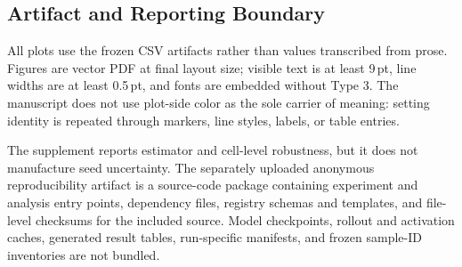 \documentclass[letterpaper]{article} %
\begin{document}
\subsection{Artifact and Reporting Boundary}

All plots use the frozen CSV artifacts rather than values transcribed from prose. Figures
are vector PDF at final layout size; visible text is at least 9\,pt, line widths are
at least 0.5\,pt, and fonts are embedded without Type 3. The manuscript does not use
plot-side color as the sole carrier of meaning: setting identity is repeated through
markers, line styles, labels, or table entries.

The supplement reports estimator and cell-level robustness, but it does not manufacture
seed uncertainty. The separately uploaded anonymous reproducibility artifact is a
source-code package containing experiment and analysis entry points, dependency files,
registry schemas and templates, and file-level checksums for the included source. Model
checkpoints, rollout and activation caches, generated result tables, run-specific
manifests, and frozen sample-ID inventories are not bundled.
\end{document}
